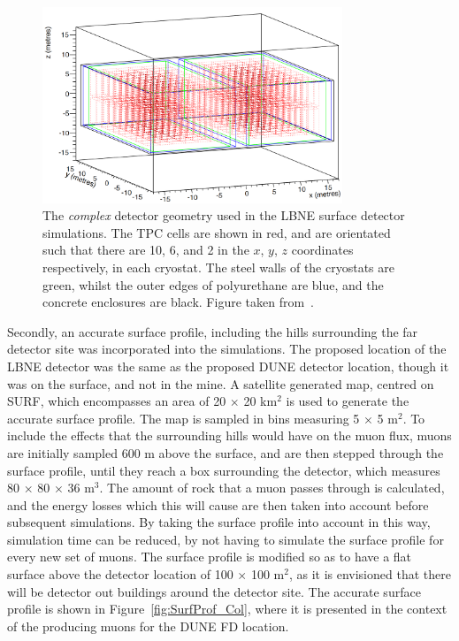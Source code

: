 \begin{figure}
  \centering
  \includegraphics[width=0.8\textwidth]{ComplexGeom}
  \caption[The \emph{complex} detector geometry used in the LBNE surface detector simulations]
          {The \emph{complex} detector geometry used in the LBNE surface detector simulations. The TPC cells are shown in red, and are orientated such that there are 10, 6, and 2 in the $x$, $y$, $z$ coordinates respectively, in each cryostat. The steel walls of the cryostats are green, whilst the outer edges of polyurethane are blue, and the concrete enclosures are black. Figure taken from~\citep{MartinsThesis}.}
  \label{fig:SurfCompGeom}
\end{figure}

Secondly, an accurate surface profile, including the hills surrounding the far detector site was incorporated into the simulations. The proposed location of the LBNE detector was the same as the proposed DUNE detector location, though it was on the surface, and not in the mine. A satellite generated map, centred on SURF, which encompasses an area of 20 $\times$ 20 km$^2$ is used to generate the accurate surface profile. The map is sampled in bins measuring 5 $\times$ 5 m$^2$. To include the effects that the surrounding hills would have on the muon flux, muons are initially sampled 600 m above the surface, and are then stepped through the surface profile, until they reach a box surrounding the detector, which measures 80 $\times$ 80 $\times$ 36 m$^3$.  The amount of rock that a muon passes through is calculated, and the energy losses which this will cause are then taken into account before subsequent simulations. By taking the surface profile into account in this way, simulation time can be reduced, by not having to simulate the surface profile for every new set of muons. The surface profile is modified so as to have a flat surface above the detector location of 100 $\times$ 100 m$^2$, as it is envisioned that there will be detector out buildings around the detector site. The accurate surface profile is shown in Figure~\ref{fig:SurfProf_Col}, where it is presented in the context of the producing muons for the DUNE FD location. \\

